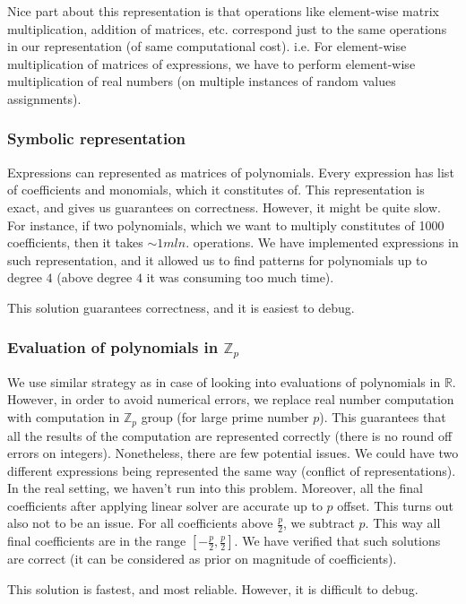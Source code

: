 \documentclass{article}
\begin{document}
Nice part about this representation is that operations like element-wise matrix multiplication, addition of matrices, etc.
correspond just to the same operations in our representation (of same computational cost). i.e. For element-wise multiplication of matrices of expressions, we
have to perform element-wise multiplication of real numbers (on multiple instances of random values assignments).

\subsubsection{Symbolic representation}
Expressions can represented as matrices of polynomials. Every expression has list of coefficients and monomials, which it constitutes of.
This representation is exact, and gives us guarantees on correctness. However,
it might be quite slow. For instance, if two polynomials, which we want to multiply constitutes of 1000 coefficients, then
it takes $\sim 1mln.$ operations. We have implemented expressions in such representation, and it allowed us
to find patterns for polynomials up to degree $4$ (above degree $4$ it was consuming too much time).

This solution guarantees correctness, and it is easiest to debug.

\subsubsection{Evaluation of polynomials in $\mathbb{Z}_p$}
We use similar strategy as in case of looking into evaluations of polynomials in $\mathbb{R}$. However, in order
to avoid numerical errors, we replace real number computation with computation in $\mathbb{Z}_p$ group (for large prime number $p$). This
guarantees that all the results of the computation are represented correctly (there is no round off errors on integers). Nonetheless, there are few potential
issues. We could have two different expressions being represented the same way (conflict of representations). In the
real setting, we haven't run into this problem. Moreover, all the final coefficients after applying linear solver are
accurate up to $p$ offset. This turns out also not to be an issue. For all coefficients above $\frac{p}{2}$, we subtract $p$. 
This way all final coefficients are in the range $[-\frac{p}{2}, \frac{p}{2}]$. We have verified that such solutions are correct
(it can be considered as prior on magnitude of coefficients). 

This solution is fastest, and most reliable. However, it is difficult to debug.
\end{document}
